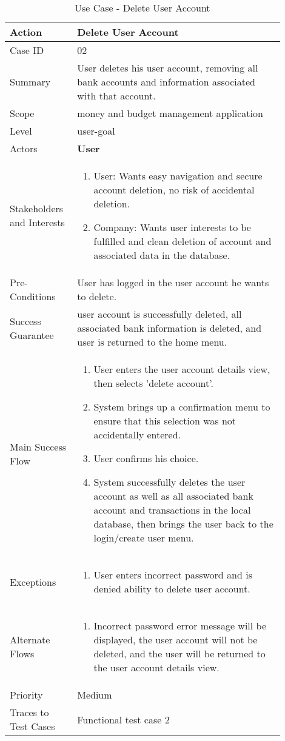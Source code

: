 \documentclass[11pt]{article}
\newcounter{use case ID}
\newcommand\tabularhead[1]{
    \begin{table}[ht]
        \addtocounter{use case ID}{1}
        \caption{Use Case \arabic{use case ID} - #1}
        \vspace{0.2cm}
        \begin{tabular}{|p{0.2\linewidth}|p{0.70\linewidth}|}
            \hline
            \textbf{Action} & \textbf{#1} \\
            \hline}
\newcommand\addrow[2]{#1 & #2\\ \hline}
\newcommand\addmulrow[2]{ \begin{minipage}[t][][t]{2.5cm}#1\end{minipage}
                &\begin{minipage}[t][][t]{11cm}
                    \begin{enumerate}[itemsep=-1ex] #2   \end{enumerate}
                \end{minipage}\vfill\\ \hline}
\newenvironment{usecase}{\tabularhead}
        {\hline\end{tabular}\end{table}}
\begin{document}
\begin{usecase}{Delete User Account}
    \addrow{Case ID}{02}
    \addrow{Summary}{User deletes his user account, removing all bank accounts and information associated with that account.}
     \addrow{Scope}{money and budget management application}
     \addrow{Level}{user-goal}
     \addrow{Actors}{\textbf{User}}
     \addmulrow{Stakeholders and Interests}{
     \item User: Wants easy navigation and secure account deletion, no risk of accidental deletion.
     \item Company: Wants user interests to be fulfilled and clean deletion of account and associated data in the database. }
     \addrow{Pre-Conditions}{User has logged in the user account he wants to delete.}
     \addrow{Success Guarantee}{user account is successfully deleted, all associated bank information is deleted, and user is returned to the home menu.}
     \addmulrow{Main Success Flow}{
     \item User enters the user account details view, then selects 'delete account'.
     \item System brings up a confirmation menu to ensure that this selection was not accidentally entered.
     \item User confirms his choice.
     \item System successfully deletes the user account as well as all associated bank account and transactions in the local database, then brings the user back to the login/create user menu.}
     \addmulrow{Exceptions}{
     \item User enters incorrect password and is denied ability to delete user account.
     }
     \addmulrow{Alternate Flows}{
     \item Incorrect password error message will be displayed, the user account will not be deleted, and the user will be returned to the user account details view.}
     \addrow{Priority}{Medium}
     \addrow{Traces to Test Cases}{Functional test case 2}
\end{usecase}
\end{document}
